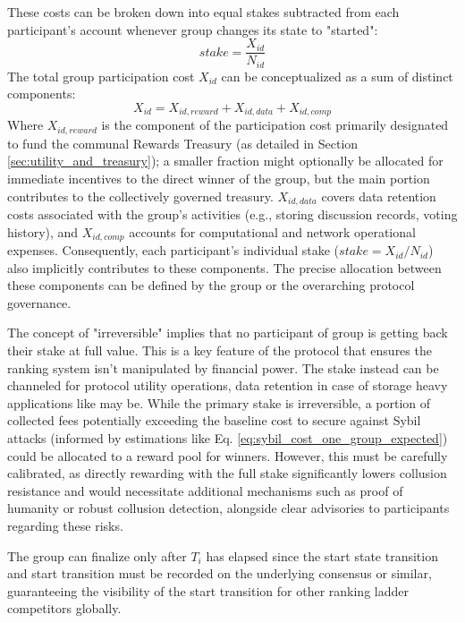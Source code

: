 \documentclass{article}
\begin{document}
\begin{CJK}{UTF8}{gbsn}
    These costs can be broken down into equal stakes subtracted from each participant's account whenever group changes its state to "started":
    \begin{equation}
        \label{eq:join-fee}
        stake = \dfrac{X_{id}}{ N_{id}}
    \end{equation}
    The total group participation cost $X_{id}$ can be conceptualized as a sum of distinct components:
    \begin{equation}
        X_{id} = X_{id,reward} + X_{id,data} + X_{id,comp}
    \end{equation}
    Where $X_{id,reward}$ is the component of the participation cost primarily designated to fund the communal Rewards Treasury (as detailed in Section \ref{sec:utility_and_treasury}); a smaller fraction might optionally be allocated for immediate incentives to the direct winner of the group, but the main portion contributes to the collectively governed treasury. $X_{id,data}$ covers data retention costs associated with the group's activities (e.g., storing discussion records, voting history), and $X_{id,comp}$ accounts for computational and network operational expenses. Consequently, each participant's individual stake ($stake = X_{id} / N_{id}$) also implicitly contributes to these components. The precise allocation between these components can be defined by the group or the overarching protocol governance.
    
    The concept of "irreversible" implies that no participant of group is getting back their stake at full value. This is a key feature of the protocol that ensures the ranking system isn't manipulated by financial power. The stake instead can be channeled for protocol utility operations, data retention in case of storage heavy applications like \cite{cvpp} may be. While the primary stake is irreversible, a portion of collected fees potentially exceeding the baseline cost to secure against Sybil attacks (informed by estimations like Eq. \ref{eq:sybil_cost_one_group_expected}) could be allocated to a reward pool for winners. However, this must be carefully calibrated, as directly rewarding with the full stake significantly lowers collusion resistance and would necessitate additional mechanisms such as proof of humanity \cite{WorldCoin2024} or robust collusion detection, alongside clear advisories to participants regarding these risks.



    The group can finalize only after $T_{i}$ has elapsed since the start state transition and start transition must be recorded on the underlying consensus or similar, guaranteeing the visibility of the start transition for other ranking ladder competitors globally.


\end{CJK}
\end{document}
